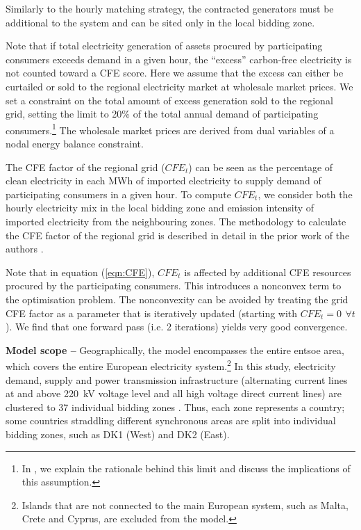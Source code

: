 \documentclass[11pt, 5p, nopreprintline]{elsarticle}
\begin{document}
Similarly to the hourly matching strategy, the contracted generators must be additional to the system and can be sited only in the local bidding zone.

Note that if total electricity generation of assets procured by participating consumers exceeds demand in a given hour, the \enquote{excess} carbon-free electricity is not counted toward a CFE score.
Here we assume that the excess can either be curtailed or sold to the regional electricity market at wholesale market prices.
We set a constraint on the total amount of excess generation sold to the regional grid, setting the limit to 20\% of the total annual demand of participating consumers.\footnote{In , we explain the rationale behind this limit and discuss the implications of this assumption.}
The wholesale market prices are derived from dual variables of a nodal energy balance constraint.

The CFE factor of the regional grid ($CFE_t$) can be seen as the percentage of clean electricity in each MWh of imported electricity to supply demand of participating consumers in a given hour.
To compute $CFE_t$, we consider both the hourly electricity mix in the local bidding zone and emission intensity of imported electricity from the neighbouring zones.
The methodology to calculate the CFE factor of the regional grid is described in detail in the prior work of the authors \cite{riepin-zenodo-systemlevel247}.

Note that in equation (\ref{eqn:CFE}), $CFE_t$ is affected by additional CFE resources procured by the participating consumers.
This introduces a nonconvex term to the optimisation problem.
The nonconvexity can be avoided by treating the grid CFE factor as a parameter that is iteratively updated (starting with $CFE_t =0 \,~\forall t$).
We find that one forward pass (i.e. 2 iterations) yields very good convergence.


\textbf{Model scope --} Geographically, the model encompasses the entire \gls{entsoe} area, which covers the entire European electricity system.\footnote{Islands that are not connected to the main European system, such as Malta, Crete and Cyprus, are excluded from the model.}
In this study, electricity demand, supply and power transmission infrastructure (alternating current lines at and above 220~kV voltage level and all high voltage direct current lines) are clustered to 37 individual bidding zones \cite{PyPSAEur-docs-spatialresolution}.
Thus, each zone represents a country; some countries straddling different synchronous areas are split into individual bidding zones, such as DK1 (West) and DK2 (East).
\end{document}
